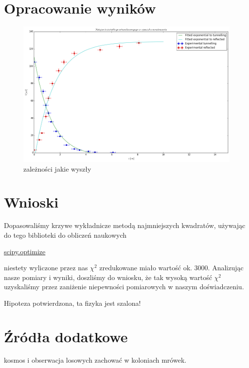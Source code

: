 \documentclass[a4paper,12pt]{article}
\begin{document}
\section{Opracowanie wyników}


\begin{figure} [H]
  \begin{center}
    \includegraphics[width = 15cm]{prettier_plot.png}
    \caption{zależności jakie wyszły}
  \end{center}
\end{figure}

\section{Wnioski}

Dopasowaliśmy krzywe wykładnicze metodą najmniejszych kwadratów, używając do tego biblioteki do obliczeń naukowych 

\href{'http://docs.scipy.org/doc/scipy/reference/tutorial/optimize.html'}{scipy.optimize}

niestety wyliczone przez nas $\chi^2$ zredukowane miało wartość ok. 3000. Analizując nasze pomiary i wyniki, doszliśmy do wniosku, że tak wysoką wartość $\chi^2$ uzyskaliśmy przez zaniżenie niepewności pomiarowych w naszym doświadczeniu.






{\Large Hipoteza potwierdzona, ta fizyka jest szalona! }

\section {Źródła dodatkowe}
  
 kosmos i obserwacja losowych zachować w koloniach mrówek. 
\end{document}
